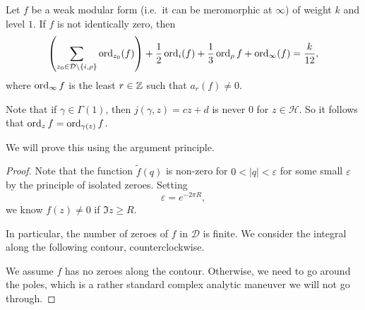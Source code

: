 \documentclass[a4paper]{article}
\renewcommand{\H}{\mathcal{H}}
\begin{document}
\begin{prop}
  Let $f$ be a weak modular form (i.e.\ it can be meromorphic at $\infty$) of weight $k$ and level $1$. If $f$ is not identically zero, then
  \[
    \left(\sum_{z_0 \in \mathcal{D} \setminus \{i, \rho\}} \operatorname{ord}_{z_0} (f)\right) + \frac{1}{2} \operatorname{ord}_i(f) + \frac{1}{3} \operatorname{ord}_\rho f + \operatorname{ord}_\infty(f) = \frac{k}{12},
  \]
  where $\operatorname{ord}_\infty f$ is the least $r \in \mathbb{Z}$ such that $a_r(f) \not= 0$.
\end{prop}
Note that if $\gamma \in \Gamma(1)$, then $j(\gamma, z) = cz + d$ is never $0$ for $z \in \H$. So it follows that $\operatorname{ord}_z f = \operatorname{ord}_{\gamma(z)} f$.

We will prove this using the argument principle.
\begin{proof}
  Note that the function $\tilde{f}(q)$ is non-zero for $0 < |q| < \varepsilon$ for some small $\varepsilon$ by the principle of isolated zeroes. Setting
  \[
    \varepsilon = e^{-2\pi R},
  \]
  we know $f(z) \not= 0$ if $\Im z \geq R$.

  In particular, the number of zeroes of $f$ in $\mathcal{D}$ is finite. We consider the integral along the following contour, counterclockwise.
  \begin{center}
  \end{center}
  We assume $f$ has no zeroes along the contour. Otherwise, we need to go around the poles, which is a rather standard complex analytic maneuver we will not go through.


\end{proof}
\end{document}
